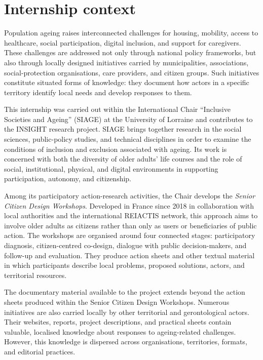 
\section{Internship context}

Population ageing raises interconnected challenges for housing, mobility, access
to healthcare, social participation, digital inclusion, and support for caregivers.
These challenges are addressed not only through national policy frameworks, but
also through locally designed initiatives carried by municipalities, associations,
social-protection organisations, care providers, and citizen groups. Such
initiatives constitute situated forms of knowledge: they document how actors in a
specific territory identify local needs and develop responses to them.

This internship was carried out within the International Chair ``Inclusive
Societies and Ageing'' (SIAGE) at the University of Lorraine and contributes to
the INSIGHT research project. SIAGE brings together research in the social
sciences, public-policy studies, and technical disciplines in order to examine the
conditions of inclusion and exclusion associated with ageing. Its work is concerned
with both the diversity of older adults' life courses and the role of social,
institutional, physical, and digital environments in supporting participation,
autonomy, and citizenship.

Among its participatory action-research activities, the Chair develops the
\textit{Senior Citizen Design Workshops}. Developed in France since 2018 in
collaboration with local authorities and the international REIACTIS network, this
approach aims to involve older adults as citizens rather than only as users or
beneficiaries of public action. The workshops are organised around four connected
stages: participatory diagnosis, citizen-centred co-design, dialogue with public
decision-makers, and follow-up and evaluation. They produce action sheets and
other textual material in which participants describe local problems, proposed
solutions, actors, and territorial resources.

The documentary material available to the project extends beyond the action sheets
produced within the Senior Citizen Design Workshops. Numerous initiatives are also
carried locally by other territorial and gerontological actors. Their websites,
reports, project descriptions, and practical sheets contain valuable, localised
knowledge about responses to ageing-related challenges. However, this knowledge is
dispersed across organisations, territories, formats, and editorial practices.

